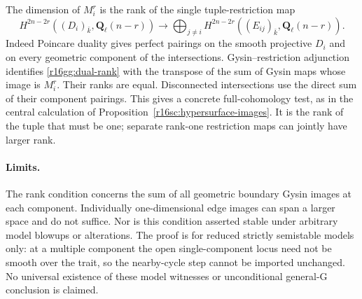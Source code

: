 \begin{remark}
\label{r16gg:dual-test}
The dimension of $M_i^r$ is the rank of the single tuple-restriction map
\[
 H^{2n-2r}((D_i)_{\bar k},\mathbf Q_\ell(n-r))
 \longrightarrow
 \bigoplus_{j\ne i}H^{2n-2r}((E_{ij})_{\bar k},\mathbf Q_\ell(n-r)).
 \tag{GG16.13}\label{r16gg:dual-rank}
\]
Indeed Poincare duality gives perfect pairings on the smooth
projective $D_i$ and on every geometric component of the
intersections. Gysin--restriction adjunction identifies
\eqref{r16gg:dual-rank} with the transpose of the sum of Gysin
maps whose image is $M_i^r$. Their ranks are equal. Disconnected
intersections use the direct sum of their component pairings.
This gives a concrete full-cohomology test, as in the central
calculation of Proposition~\ref{r16sc:hypersurface-images}.
It is the rank of the tuple that must be one; separate rank-one
restriction maps can jointly have larger rank.
\end{remark}

\paragraph{Limits.}
The rank condition concerns the sum of all geometric boundary
Gysin images at each component. Individually one-dimensional
edge images can span a larger space and do not suffice.
Nor is this condition asserted stable under arbitrary model
blowups or alterations. The proof is for reduced strictly
semistable models only: at a multiple component the open
single-component locus need not be smooth over the trait,
so the nearby-cycle step cannot be imported unchanged.
No universal existence of these model witnesses or unconditional
general-G conclusion is claimed.
